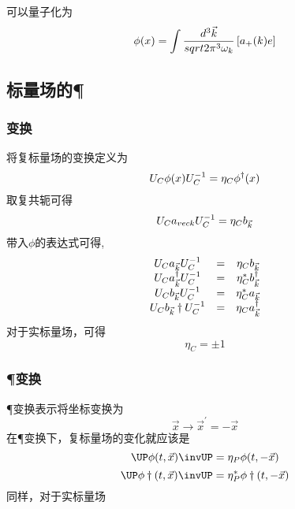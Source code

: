 可以量子化为
\begin{equation}
    \phi(x) = \int \frac{d^3\vec{k}}{sqrt{2\pi^3}\omega_{k}} \left[a_+(k)e\right]
\end{equation}

\subsection{标量场的\C \P \T}
\subsubsection{\C 变换}
将复标量场的\C 变换定义为
\begin{equation}
    U_{C}\phi(x)U_{C}^{-1} = \eta_C\phi^\dagger(x)
\end{equation}
取复共轭可得
\begin{equation}
    U_{C} a_{vec k}U_{C}^{-1} = \eta_C b_{\vec k}
\end{equation}
带入$\phi$的表达式可得,
\begin{equation}
    \begin{array}{ccc}
        U_{C} a_{\vec k} U_{C}^{-1} &=& \eta_C b_{\vec k} \\
        U_{C} a_{\vec k}^\dagger U_{C}^{-1} &=& \eta_C^* b_{\vec k}^\dagger \\
        U_{C} b_{\vec k} U_{C}^{-1} &=& \eta_C^* a_{\vec k} \\
        U_{C} b_{\vec k}\dagger U_{C}^{-1} &=& \eta_C a_{\vec k}^\dagger \\
\end{array}
\end{equation}
对于实标量场，可得
\begin{equation}
    \eta_C = \pm 1
\end{equation}
\subsubsection{\P 变换}
\P 变换表示将坐标变换为
\begin{equation}
    \vec x \rightarrow \vec x^\prime = -\vec x
\end{equation}
在\P 变换下，复标量场的变化就应该是
\begin{equation}
    \UP\phi(t,\vec x)\invUP = \eta_P\phi(t,-\vec x)
    \end{equation}
\begin{equation}
    \UP\phi\dagger(t,\vec x)\invUP = \eta_P^*\phi\dagger(t,-\vec x)
    \end{equation}
    同样，对于实标量场

